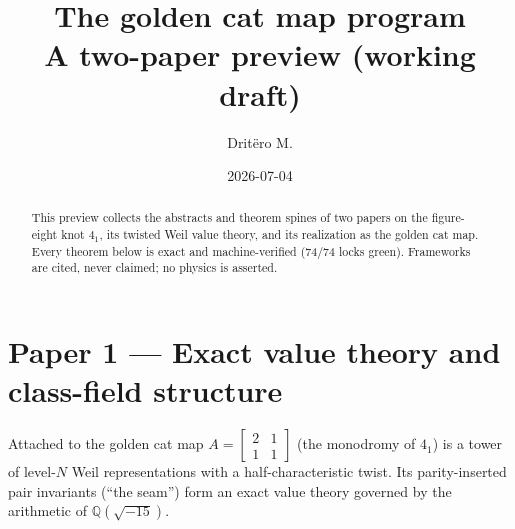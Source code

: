 \documentclass[11pt,reqno]{amsart}
\title{The golden cat map program \\ \large A two-paper preview (working draft)}
\author{Dritëro M.}
\date{2026-07-04}
\theoremstyle{definition}
\newcommand{\Q}{\mathbb{Q}}
\begin{document}
\maketitle

\begin{abstract}
\noindent This preview collects the abstracts and theorem spines of two papers on the
figure-eight knot $4_1$, its twisted Weil value theory, and its realization as the golden
cat map. Every theorem below is exact and machine-verified (74/74 locks green). Frameworks
are cited, never claimed; no physics is asserted.
\end{abstract}

\section*{Paper 1 --- Exact value theory and class-field structure}

Attached to the golden cat map $A=\left[\begin{smallmatrix}2&1\\1&1\end{smallmatrix}\right]$
(the monodromy of $4_1$) is a tower of level-$N$ Weil representations with a
half-characteristic twist. Its parity-inserted pair invariants (``the seam'') form an exact
value theory governed by the arithmetic of $\Q(\sqrt{-15})$.
\end{document}
